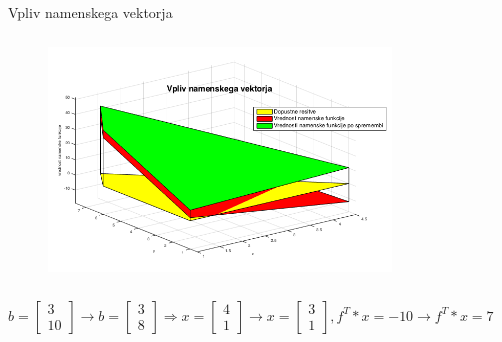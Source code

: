 \documentclass[t]{beamer}
\begin{document}
\begin{frame}{Vpliv namenskega vektorja}
\begin{center}
\begin{figure}[h]
\includegraphics[width=9.1cm,height=6.5cm]{viz2.png}
\end{figure}
$b=\begin{bmatrix} 3 \\ 10 \end{bmatrix} \to b=\begin{bmatrix} 3 \\ 8\end{bmatrix} \Rightarrow x=\begin{bmatrix} 4 \\ 1 \end{bmatrix} \to x=\begin{bmatrix} 3 \\ 1\end{bmatrix}, f^T*x=-10 \to f^T*x=7$
\end{center}
\end{frame}
\end{document}
